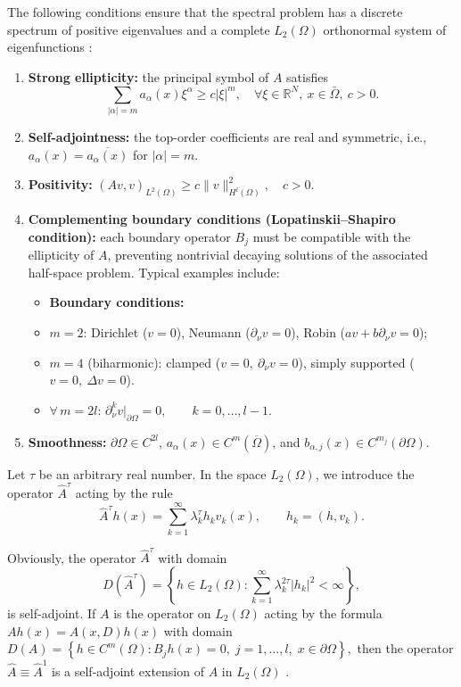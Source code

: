 \documentclass[12pt, reqno]{amsart}
\theoremstyle{definition}
\theoremstyle{remark}
\numberwithin{equation}{section}
\begin{document}
The following conditions ensure that the spectral problem has a discrete spectrum of positive eigenvalues 
and a complete $L_2(\Omega)$ orthonormal system of eigenfunctions \cite{19}:

\begin{enumerate}
    \item \textbf{Strong ellipticity:} the principal symbol of $A$ satisfies
    \[
        \sum_{|\alpha|=m} a_\alpha(x) \xi^\alpha \ge c |\xi|^m, \quad \forall \xi \in \mathbb{R}^N, \ x \in \bar{\Omega}, \ c>0.
    \]
    \item \textbf{Self-adjointness:} the top-order coefficients are real and symmetric, i.e.,
    $a_\alpha(x) = \overline{a_\alpha(x)}$ for $|\alpha|=m$.

    \item \textbf{Positivity:} 
        $(Av,v)_{L^2(\Omega)} \ge c \|v\|_{H^l(\Omega)}^2, \quad c>0.$
    \item \textbf{Complementing boundary conditions (Lopatinskii--Shapiro condition):} 
    each boundary operator $B_j$ must be compatible with the ellipticity of $A$, 
    preventing nontrivial decaying solutions of the associated half-space problem.
    Typical examples include:
    \begin{itemize}
 \item \textbf{Boundary conditions:}
    \item $m=2$: Dirichlet ($v=0$), Neumann ($\partial_\nu v=0$), Robin ($a v + b \partial_\nu v=0$);
    
    \item $m=4$ (biharmonic): clamped ($v=0,\ \partial_\nu v=0$), simply supported ($v=0,\ \Delta v=0$).
    
    \item $\forall\, m=2l$: \quad
    $\partial_\nu^{k} v\big|_{\partial\Omega}=0, 
    \qquad k=0,\dots,l-1.$
\end{itemize}

\item \textbf{Smoothness:} 
$\partial \Omega \in C^{2l}$, 
$a_\alpha(x) \in C^{m}(\overline{\Omega})$, 
and $b_{\alpha,j}(x) \in C^{m_j}(\partial \Omega)$.
\end{enumerate}


 Let $\tau$ be an arbitrary real number. In the space $L_{2}(\Omega)$, we introduce the operator
$\widehat{A}^{\tau}$ acting by the rule 
\[
\widehat{A}^{\tau} h(x)
=
\sum_{k=1}^{\infty} \lambda_k^{\tau} h_k v_k(x),
\qquad
h_k = (h, v_k).
\]

Obviously, the operator $\widehat{A}^{\tau}$ with domain
\[
D(\widehat{A}^{\tau})
=
\left\{
h \in L_{2}(\Omega) :
\sum_{k=1}^{\infty} \lambda_k^{2\tau} |h_k|^{2} < \infty
\right\},
\]
is self-adjoint. If $A$ is the operator on $L_{2}(\Omega)$ acting by the formula
$
Ah(x) = A(x,D)h(x)
$
with domain
$
D(A)
=
\left\{
h \in C^{m}(\Omega) :
B_j h(x) = 0,\; j=1,\dots,l,\; x \in \partial\Omega
\right\},
$
then the operator $\widehat{A} \equiv \widehat{A}^{1}$ is a self-adjoint extension of $A$ in
$L_{2}(\Omega)$ .
\end{document}
